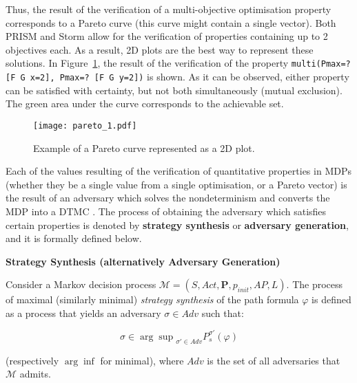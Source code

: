Thus, the result of the verification of a multi-objective optimisation property corresponds to a Pareto curve (this curve might contain a single vector). Both PRISM and Storm allow for the verification of properties containing up to 2 objectives each. As a result, 2D plots are the best way to represent these solutions. In Figure~\ref{fig:pareto_1}, the result of the verification of the property \texttt{multi(Pmax=? [F G x=2], Pmax=? [F G y=2])} is shown. As it can be observed, either property can be satisfied with certainty, but not both simultaneously (mutual exclusion). The green area under the curve corresponds to the achievable set.

\begin{figure}[h]
    \centering
    \texttt{[image: pareto\_1.pdf]}
    \caption{Example of a Pareto curve represented as a 2D plot.}
    \label{fig:pareto_1}
\end{figure}

Each of the values resulting of the verification of quantitative properties in MDPs (whether they be a single value from a single optimisation, or a Pareto vector) is the result of an adversary which solves the nondeterminism and converts the MDP into a DTMC \cite{bk08}. The process of obtaining the adversary which satisfies certain properties is denoted by \textbf{strategy synthesis} or \textbf{adversary generation}, and it is formally defined below.

{\begin{defi}
{\setlength{\parskip}{2em}
\textbf{Strategy Synthesis (alternatively Adversary Generation)}\vspace{1em}\\}
{\setlength{\parskip}{1em} 

Consider a Markov decision process $\mathcal{M} = (S, Act, \mathbf{P}, p_{init}, AP, L)$. The process of maximal (similarly minimal) \textit{strategy synthesis} of the path formula $\varphi$ is defined as a process that yields an adversary $\sigma \in Adv$ such that:

\begin{equation}
	\sigma \in {\arg\sup}_{\sigma' \in Adv} P^{\sigma'}_s (\varphi)
\end{equation}

(respectively $\arg\inf$ for minimal), where $Adv$ is the set of all adversaries that $\mathcal{M}$ admits.

}
\end{defi}}


